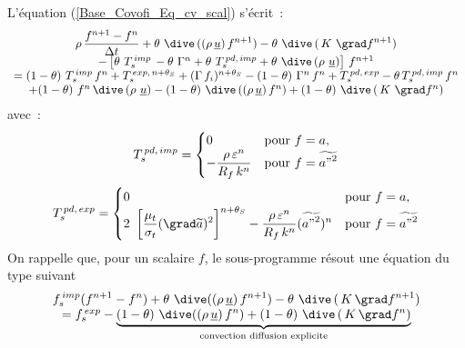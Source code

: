 L'équation (\ref{Base_Covofi_Eq_cv_scal}) s'écrit~:
\begin{equation}\label{Base_Covofi_Eq_scal_tempo}
\begin{array}{c}
\displaystyle
 \rho\,\frac {f^{n+1}-f^{n}}{\Delta t} +
\theta \,\,\dive\,((\rho\,\underline{u})\,f^{n+1})- \theta \,\,\dive\,(\,K\ \grad f^{n+1})
\\
-\left[ \theta\,\, T_s^{\,imp}\,- \theta\,\, \Gamma^{n} + \theta\,\, T_s^{\,pd,\,imp}+\theta\,\,
\dive\,(\rho\ \underline{u})\right]\,f^{n+1}
\\
= (1-\theta)\,\,T_s^{\,imp}\,f^{n} + T_s^{\,exp,\,n+\theta_S} +
(\Gamma\,f_i)^{n+\theta_S}-(1-\theta)\,\,\Gamma^{n}\,
f^{n}+ T_s^{\,pd,\,exp}-\theta\,T_s^{\,pd,\,imp}\,f^{n}
\\
+ (1-\theta) \,\, f^{n}\,\dive\,(\rho\ \underline{u})- (1-\theta) \,\, \dive\,((\rho\,\underline{u})\,f^{n})
+ (1-\theta)\,\, \dive\,(\,K\ \grad f^{n})
\end{array}
\end{equation}
avec~:
\begin{equation}
T_s^{\,pd,\,imp} =
\begin{cases}
0 & \text{pour $f=a$}, \\
- \displaystyle \frac{\rho\,\varepsilon^n}{R_f \,k^n} &  \text{pour $f=\widetilde{{a"}^2}$}
\end{cases}
\end{equation}
\begin{equation}
T_s^{\,pd,\,exp}=
\begin{cases}
0 & \text{pour $f=a$}, \\
2\ \displaystyle\left[\frac{\mu_t}{\sigma_t}(\grad
\widetilde{a})^2\right]^{n+\theta_S} -
\frac{\rho\,\varepsilon^n}{R_f\,k^n}(\widetilde{{a"}^2})^n & \text{pour
$f=\widetilde{{a"}^2}$}
\end{cases}
\end{equation}
On rappelle que, pour un scalaire $f$, le sous-programme 
résout une équation du type suivant
\label{Base_Covofi_Eq_Codits}
\begin{equation}
\begin{array}{c}
\displaystyle f_s^{\,imp} (f^{n+1} - f^{n}) +
\theta \,\, \dive((\rho\,\underline{u})\,f^{n+1})- \theta \,\, \dive\,(\,K\,\grad f^{n+1})
\\
= f_s^{\,exp} -\underbrace{(1-\theta) \,\, \dive((\rho\,\underline{u})\,f^{n}) + (1-\theta)
\,\, \dive\,(\,K\,\grad f^{n})}_{\text{convection diffusion explicite}}
\end{array}
\end{equation}
